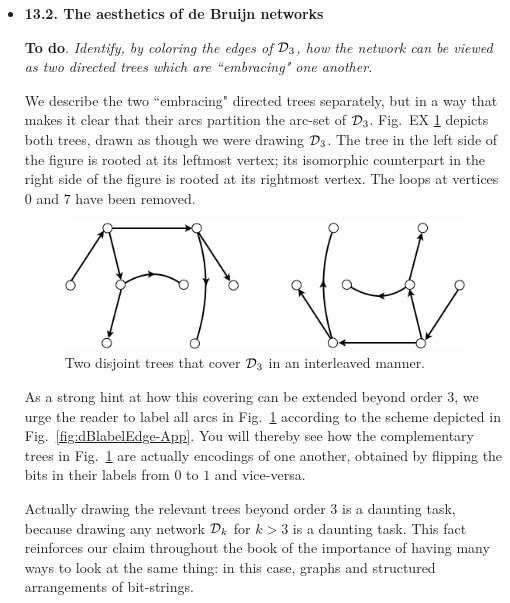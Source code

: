 \begin{itemize}
\item
{\bf 13.2. The aesthetics of de Bruijn networks}

\smallskip

{\bf To do}.
{\em Identify, by coloring the edges of $\mbox{$\cal D$}_3$, how the network can be viewed as two directed trees which are ``embracing" one another.}

\smallskip

We describe the two ``embracing" directed trees separately, but in a way that makes it clear that their arcs partition the arc-set of $\mbox{$\cal D$}_3$.  Fig.~EX \ref{fig:DeBruijn3Tree} depicts both trees, drawn as though we were drawing $\mbox{$\cal D$}_3$.  The tree in the left side of the figure is rooted at its leftmost vertex;  its isomorphic counterpart in the right side of the figure is rooted at its rightmost vertex. 
The loops at vertices $0$ and $7$ have been removed. 
\begin{figure}[h]
\begin{center}
        \includegraphics[scale=0.4]{FiguresGraph/DeBruijn3Tree}
        \caption{Two disjoint trees that cover $\mbox{$\cal D$}_3$ in an interleaved manner.}
        \label{fig:DeBruijn3Tree}
\end{center}
\end{figure}

As a strong hint at how this covering can be extended beyond order $3$, we urge the reader to label all arcs in Fig.~\ref{fig:DeBruijn3Tree} according to the scheme depicted in Fig.~\ref{fig:dBlabelEdge-App}.  You will thereby see how the complementary trees in Fig.~\ref{fig:DeBruijn3Tree} are actually encodings of one another, obtained by flipping the bits in their labels from $0$ to $1$ and vice-versa.

\smallskip

Actually drawing the relevant trees beyond order $3$ is a daunting task, because drawing any network $\mbox{$\cal D$}_k$ for $k > 3$ is a daunting task.  This fact reinforces our claim throughout the book of the importance of having many ways to look at the same thing: in this case, graphs and structured arrangements of bit-strings.


\end{itemize}
